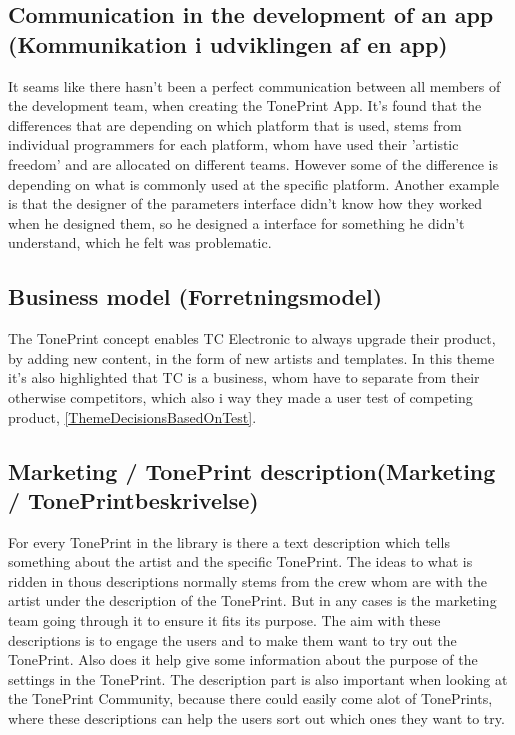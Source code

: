 \subsection*{Communication in the development of an app (Kommunikation i udviklingen af en app)}
\label{ThemeCommunicationInTheDevelopmentOfAnApp}
It seams like there hasn't been a perfect communication between all members of the development team, when creating the TonePrint App. It's found that the differences that are depending on which platform that is used, stems from individual programmers for each platform, whom have used their 'artistic freedom' and are allocated on different teams. However some of the difference is depending on what is commonly used at the specific platform. Another example is that the designer of the parameters interface didn't know how they worked when he designed them, so he designed a interface for something he didn't understand, which he felt was problematic.

\subsection*{Business model (Forretningsmodel)}
\label{ThemeBusinessModel}
The TonePrint concept enables TC Electronic to always upgrade their product, by adding new content, in the form of new artists and templates. In this theme it's also highlighted that TC is a business, whom have to separate from their otherwise competitors, which also i way they made a user test of competing product, \autoref{ThemeDecisionsBasedOnTest}.

\subsection*{Marketing / TonePrint description(Marketing / TonePrintbeskrivelse)} 
\label{ThemeMarketingTonePrintDescription}
For every TonePrint in the library is there a text description which tells something about the artist and the specific TonePrint. The ideas to what is ridden in thous descriptions normally stems from the crew whom are with the artist under the description of the TonePrint. But in any cases is the marketing team going through it to ensure it fits its purpose. The aim with these descriptions is to engage the users and to make them want to try out the TonePrint. Also does it help give some information about the purpose of the settings in the TonePrint. The description part is also important when looking at the TonePrint Community, because there could easily come alot of TonePrints, where these descriptions can help the users sort out which ones they want to try. 

